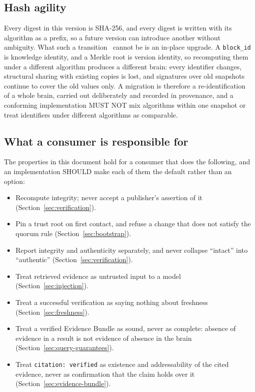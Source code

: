 \documentclass[11pt,a4paper]{article}
\begin{document}
\subsection{Hash agility}

Every digest in this version is SHA-256, and every digest is written with its
algorithm as a prefix, so a future version can introduce another without
ambiguity. What such a transition~\cite{nist2019transitions} cannot be is an
in-place upgrade. A \texttt{block\_id} is knowledge identity, and a Merkle root
is version identity, so recomputing them under a different algorithm produces a
different brain: every identifier changes, structural sharing with existing
copies is lost, and signatures over old snapshots continue to cover the old
values only. A migration is therefore a re-identification of a whole brain,
carried out deliberately and recorded in provenance, and a conforming
implementation MUST NOT mix algorithms within one snapshot or treat identifiers
under different algorithms as comparable.

\subsection{What a consumer is responsible for}

The properties in this document hold for a consumer that does the following, and
an implementation SHOULD make each of them the default rather than an option:

\begin{itemize}[leftmargin=1.4em]
  \item Recompute integrity; never accept a publisher's assertion of it
  (Section~\ref{sec:verification}).
  \item Pin a trust root on first contact, and refuse a change that does not
  satisfy the quorum rule (Section~\ref{sec:bootstrap}).
  \item Report integrity and authenticity separately, and never collapse
  ``intact'' into ``authentic'' (Section~\ref{sec:verification}).
  \item Treat retrieved evidence as untrusted input to a model
  (Section~\ref{sec:injection}).
  \item Treat a successful verification as saying nothing about freshness
  (Section~\ref{sec:freshness}).
  \item Treat a verified Evidence Bundle as sound, never as complete: absence of
evidence in a result is not evidence of absence in the brain
(Section~\ref{sec:query-guarantees}).   \item Treat \texttt{citation:
verified} as existence and addressability of the cited evidence, never as
confirmation that the claim holds over it (Section~\ref{sec:evidence-bundle}).
\end{itemize}
\end{document}

